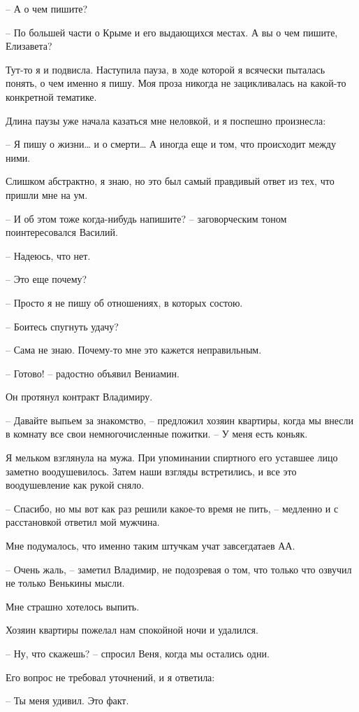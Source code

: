 \documentclass[
]{book}
\begin{document}
-- А о чем пишите?

-- По большей части о Крыме и его выдающихся местах. А вы о чем пишите, Елизавета?

Тут-то я и подвисла. Наступила пауза, в ходе которой я всячески пыталась понять, о чем именно я пишу. Моя проза никогда не зацикливалась на какой-то конкретной тематике.

Длина паузы уже начала казаться мне неловкой, и я поспешно произнесла:

-- Я пишу о жизни\ldots{} и о смерти\ldots{} А иногда еще и том, что происходит между ними.

Слишком абстрактно, я знаю, но это был самый правдивый ответ из тех, что пришли мне на ум.

-- И об этом тоже когда-нибудь напишите? -- заговорческим тоном поинтересовался Василий.

-- Надеюсь, что нет.

-- Это еще почему?

-- Просто я не пишу об отношениях, в которых состою.

-- Боитесь спугнуть удачу?

-- Сама не знаю. Почему-то мне это кажется неправильным.

-- Готово! -- радостно объявил Вениамин.

Он протянул контракт Владимиру.

-- Давайте выпьем за знакомство, -- предложил хозяин квартиры, когда мы внесли в комнату все свои немногочисленные пожитки. -- У меня есть коньяк.

Я мельком взглянула на мужа. При упоминании спиртного его уставшее лицо заметно воодушевилось. Затем наши взгляды встретились, и все это воодушевление как рукой сняло.

-- Спасибо, но мы вот как раз решили какое-то время не пить, -- медленно и с расстановкой ответил мой мужчина.

Мне подумалось, что именно таким штучкам учат завсегдатаев АА.

-- Очень жаль, -- заметил Владимир, не подозревая о том, что только что озвучил не только Венькины мысли.

Мне страшно хотелось выпить.

Хозяин квартиры пожелал нам спокойной ночи и удалился.

-- Ну, что скажешь? -- спросил Веня, когда мы остались одни.

Его вопрос не требовал уточнений, и я ответила:

-- Ты меня удивил. Это факт.
\end{document}
